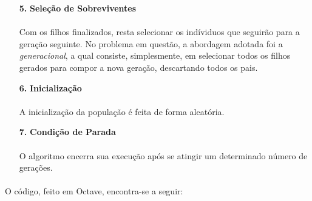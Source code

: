 \documentclass{report}
\begin{document}
\begin{itemize}
		\item[\textbf{5.}] \textbf{Seleção de Sobreviventes}
		
		\paragraph{} Com os filhos finalizados, resta selecionar os indíviduos que seguirão para a geração seguinte. No problema em questão, a abordagem adotada foi a \emph{generacional}, a qual consiste, simplesmente, em selecionar todos os filhos gerados para compor a nova geração, descartando todos os pais.\\
		
		\item[\textbf{6.}] \textbf{Inicialização}
		
		\paragraph{} A inicialização da população é feita de forma aleatória.\\
		
		\item[\textbf{7.}] \textbf{Condição de Parada}
		
		\paragraph{} O algoritmo encerra sua execução após se atingir um determinado número de gerações.\\
	
	\end{itemize}

	\paragraph{} O código, feito em Octave, encontra-se a seguir:\\
	
\end{document}
